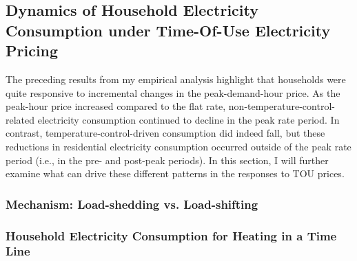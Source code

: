 \subsection{Dynamics of Household Electricity Consumption under Time-Of-Use Electricity Pricing}
\label{Subsection:Dynamics-of-Household-Electricity-Consumption-under-Time-Of-Use-Electricity-Pricing}

The preceding results from my empirical analysis highlight that households were quite responsive to incremental changes in the peak-demand-hour price. As the peak-hour price increased compared to the flat rate, non-temperature-control-related electricity consumption continued to decline in the peak rate period. In contrast, temperature-control-driven consumption did indeed fall, but these reductions in residential electricity consumption occurred outside of the peak rate period (i.e., in the pre- and post-peak periods). In this section, I will further examine what can drive these different patterns in the responses to TOU prices. 

\subsubsection{Mechanism: Load-shedding vs. Load-shifting}
\label{Sub-subsection:Mechanism}


\subsubsection{Household Electricity Consumption for Heating in a Time Line}
\label{Sub-subsection:Household-Electricity-Consumption-for-Heating-in-a-Time-Line}

